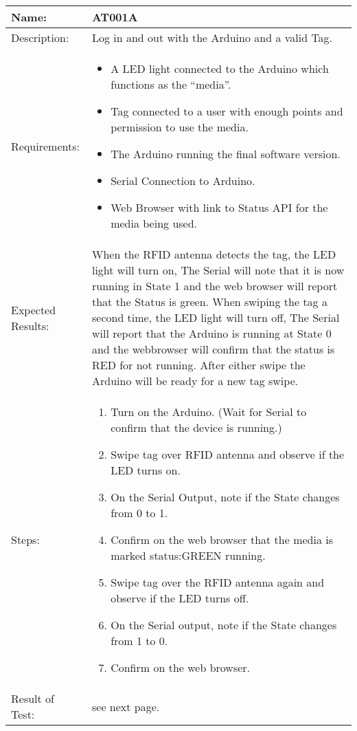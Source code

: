 \begin{table}[h]
	\centering
		\begin{tabular}{|l|p{9cm}|}
		\hline
		\hline
		Name: & AT001A\\
		\hline
		Description: & Log in and out with the Arduino and a valid Tag.\\
		\hline
		Requirements: & 
		\begin{itemize}
		  \item A LED light connected to the Arduino which functions as the ``media''.
			\item Tag connected to a user with enough points and permission to use the media.
			\item The Arduino running the final software version.
			\item Serial Connection to Arduino.
			\item Web Browser with link to Status API for the media being used.
		\end{itemize}\\
		\hline
		Expected Results: & When the RFID antenna detects the tag, the LED light will turn on, The Serial will note that it is now running in State 1 and the web browser will report that the Status is green.
		When swiping the tag a second time, the LED light will turn off, The Serial will report that the Arduino is running at State 0 and the webbrowser will confirm that the status is RED for not running.
		After either swipe the Arduino will be ready for a new tag swipe.\\
		\hline
		Steps: & 
		\begin{enumerate}
			\item Turn on the Arduino. (Wait for Serial to confirm that the device is running.)
			\item Swipe tag over RFID antenna and observe if the LED turns on.
			\item On the Serial Output, note if the State changes from 0 to 1.
			\item Confirm on the web browser that the media is marked status:GREEN  running.
			\item Swipe tag over the RFID antenna again and observe if the LED turns off.
			\item On the Serial output, note if the State changes from 1 to 0.
			\item Confirm on the web browser.
		\end{enumerate}
		\\
		\hline
		Result of Test: & see next page.\\
		\hline
		\end{tabular}
\end{table}
		
